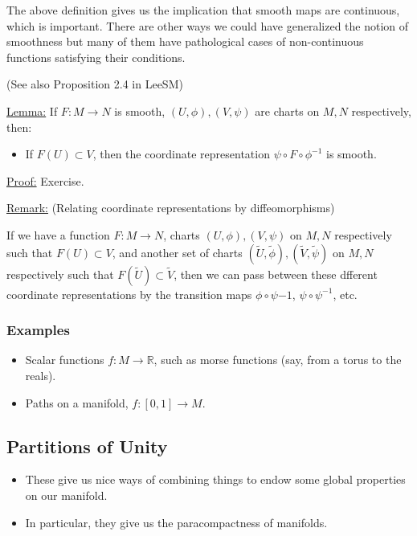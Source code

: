 \documentclass{article}
\newcommand{\R}{\mathbb{R}}
\begin{document}
\vskip 0.5cm
The above definition gives us the implication that smooth maps are continuous, which is important. There are other ways we could have generalized the notion of smoothness but many of them have pathological cases of non-continuous functions satisfying their conditions.

\vskip 0.25cm
(See also Proposition 2.4 in LeeSM)

\vskip 0.5cm
\begin{dottedbox}
  \underline{Lemma:} If $F : M \rightarrow N$ is smooth, $(U, \phi), (V, \psi)$ are charts on $M, N$ respectively, then: 
  \begin{itemize}
    \item If $F(U) \subset V$, then the coordinate representation $\psi \circ F \circ \phi^{-1}$ is smooth.
  \end{itemize}

  \vskip 0.5cm
  \underline{Proof:} Exercise.
\end{dottedbox}

\vskip 0.5cm
\underline{Remark:} (Relating coordinate representations by diffeomorphisms) 

If we have a function $F : M \rightarrow N$, charts $(U, \phi), (V, \psi)$ on $M, N$ respectively such that $F(U) \subset V$, and another set of charts $(\tilde{U}, \tilde{\phi}), (\tilde{V}, \tilde{\psi})$ on $M, N$ respectively such that $F(\tilde{U}) \subset \tilde{V}$, then we can pass between these dfferent coordinate representations by the transition maps $\phi \circ \psi{-1}$, $\psi \circ \psi^{-1}$, etc.


\vskip 1cm
\subsubsection{Examples}
\begin{itemize}
  \item Scalar functions $f : M \rightarrow \R$, such as morse functions (say, from a torus to the reals).
  \item Paths on a manifold, $f : [0, 1] \rightarrow M$.
\end{itemize}

\vskip 1cm
\subsection{Partitions of Unity}
\begin{itemize}
  \item These give us nice ways of combining things to endow some global properties on our manifold.
  \item In particular, they give us the paracompactness of manifolds.
\end{itemize}
\end{document}
